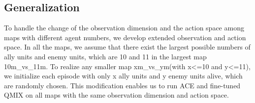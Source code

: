 \documentclass[letterpaper]{article} \usepackage{aaai23}  \usepackage{times}  \usepackage{helvet}  \usepackage{courier}  \usepackage[hyphens]{url}  \usepackage{graphicx} \urlstyle{rm} \def\UrlFont{\rm}  \usepackage{natbib}  \usepackage{caption} \frenchspacing  \setlength{\pdfpagewidth}{8.5in} \setlength{\pdfpageheight}{11in} \usepackage{algorithm}
\begin{document}
\subsection{Generalization}
To handle the change of the observation dimension and the action space among maps with different agent numbers, we develop extended observation and action space. In all the maps, we assume that there exist the largest possible numbers of ally units and enemy units, which are 10 and 11 in the largest map 10m\_vs\_11m. To realize any smaller map xm\_vs\_ym(with x<=10 and y<=11), we initialize each episode with only x ally units and y enemy units alive, which are randomly chosen. This modification enables us to run ACE and fine-tuned QMIX on all maps with the same observation dimension and action space.

\begin{figure*}[t]
\centering
    \quad
    \quad
\end{figure*}
\end{document}
